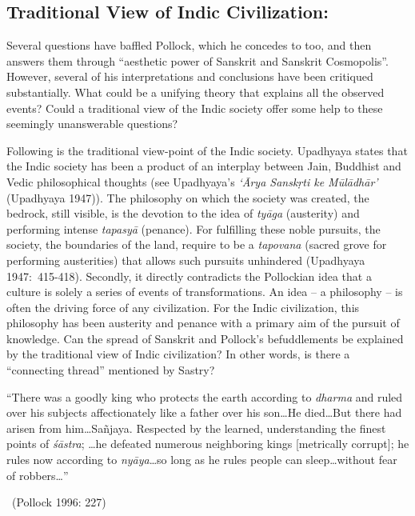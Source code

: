 \subsection*{Traditional View of Indic Civilization:}

Several questions have baffled Pollock, which he concedes to too, and then answers them through “aesthetic power of Sanskrit and Sanskrit Cosmopolis”. However, several of his interpretations and conclusions have been critiqued substantially. What could be a unifying theory that explains all the observed events? Could a traditional view of the Indic society offer some help to these seemingly unanswerable questions?

Following is the traditional view-point of the Indic society. Upadhyaya states that the Indic society has been a product of an interplay between Jain, Buddhist and Vedic philosophical thoughts (see Upadhyaya’s \textit{‘Ārya Sanskṛti ke Mūlādhār’} (Upadhyaya 1947)). The philosophy on which the society was created, the bedrock, still visible, is the devotion to the idea of \textit{tyāga} (austerity) and performing intense \textit{tapasyā} (penance). For fulfilling these noble pursuits, the society, the boundaries of the land, require to be a \textit{tapovana} (sacred grove for performing austerities) that allows such pursuits unhindered (Upadhyaya 1947:~415-418). Secondly, it directly contradicts the Pollockian idea that a culture is solely a series of events of transformations. An idea – a philosophy – is often the driving force of any civilization. For the Indic civilization, this philosophy has been austerity and penance with a primary aim of the pursuit of knowledge. Can the spread of Sanskrit and Pollock’s befuddlements be explained by the traditional view of Indic civilization? In other words, is there a “connecting thread” mentioned by Sastry?

\begin{myquote}
“There was a goodly king who protects the earth according to \textit{dharma} and ruled over his subjects affectionately like a father over his son…He died…But there had arisen from him…Sañjaya. Respected by the learned, understanding the finest points of \textit{śāstra}; …he defeated numerous neighboring kings [metrically corrupt]; he rules now according to \textit{nyāya}…so long as he rules people can sleep…without fear of robbers…” 

~\hfill (Pollock 1996: 227)
\end{myquote}


